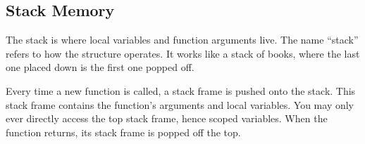 \documentclass{article}
\begin{document}
\subsection{Stack Memory}

\noindent
The stack is where local variables and function arguments live. The name ``stack'' refers to how the structure operates. It works like a stack of books, where the last one placed down is the first one popped off.

\vspace{1em}
\noindent
Every time a new function is called, a stack frame is pushed onto the stack. This stack frame contains the function's arguments and local variables. You may only ever directly access the top stack frame, hence scoped variables. When the function returns, its stack frame is popped off the top.
\end{document}
